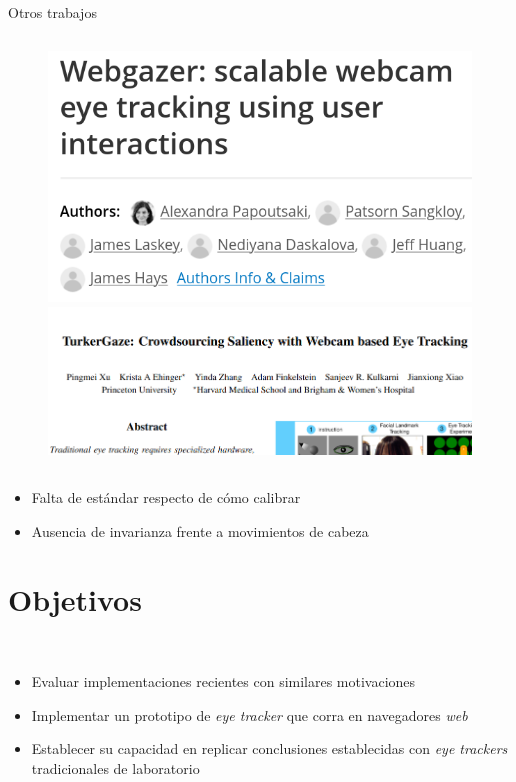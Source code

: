\documentclass[aspectratio=169]{beamer}
\begin{document}
\begin{frame}{Otros trabajos}
\begin{columns}
    \begin{column}{0.5\textwidth}
      \begin{figure}
        \centering
        \includegraphics[width=0.7\linewidth]{img/webgazer.png}
        \includegraphics[width=\linewidth]{img/turker-gaze.png}
      \end{figure}
    \end{column}
  \end{columns}
  \begin{itemize}
    \item[\emoji{thumbs-down}] Falta de estándar respecto de cómo calibrar
    \item[\emoji{thumbs-down}] Ausencia de invarianza frente a movimientos de
      cabeza
  \end{itemize}
\end{frame}

\section{Objetivos}

\begin{frame}{~}

  \begin{itemize}
    \item Evaluar implementaciones recientes con similares motivaciones
    \item Implementar un prototipo de \textit{eye tracker} que corra en
      navegadores \textit{web}
    \item Establecer su capacidad en replicar conclusiones establecidas con
      \textit{eye trackers} tradicionales de laboratorio
  \end{itemize}
\end{frame}
\end{document}
